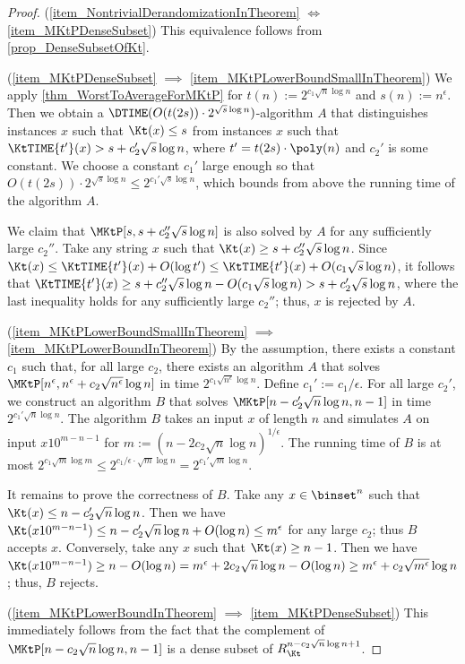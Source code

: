 \documentclass[11pt]{article}
\numberwithin{equation}{section}
\theoremstyle{definition}
\theoremstyle{plain}
\begin{document}
\begin{proof}
  (\cref{item_NontrivialDerandomizationInTheorem} $\Longleftrightarrow$ \cref{item_MKtPDenseSubset})
  This equivalence follows from \cref{prop_DenseSubsetOfKt}.

  (\cref{item_MKtPDenseSubset} $\implies$ \cref{item_MKtPLowerBoundSmallInTheorem})
  We apply \cref{thm_WorstToAverageForMKtP} for $t(n) := 2^{c_1 \sqrt{n} \log n}$ and $s(n) := n^\epsilon$.
  Then we obtain a $\DTIME(O(t(2 s)) \cdot 2^{\sqrt{s} \log n})$-algorithm $A$ that distinguishes
  \Yes instances $x$ such that $\Kt(x) \le s$
  from \No instances $x$ such that $\KtTIME{t'}(x) > s + c_2' \sqrt{s} \log n$, where $t' = t(2s) \cdot \poly(n)$ and $c_2'$ is some constant.
  We choose a constant $c_1'$ large enough so that
  $O(t(2 s)) \cdot 2^{\sqrt{s} \log n} \le 2^{c_1' \sqrt{s} \log n}$, which bounds from above the running time of the algorithm $A$.

  We claim that $\MKtP[s, s + c_2'' \sqrt{s} \log n]$ is also solved by $A$ for any sufficiently large $c_2''$.
  Take any string $x$ such that $\Kt(x) \ge s + c_2'' \sqrt{s} \log n$.
  Since $\Kt(x) \le \KtTIME{t'}(x) + O(\log t') \le \KtTIME{t'}(x) + O(c_1 \sqrt{s} \log n)$,
  it follows that $\KtTIME{t'}(x) \ge s + c_2'' \sqrt{s} \log n - O(c_1 \sqrt{s} \log n) > s + c_2' \sqrt{s} \log n$,
  where the last inequality holds for any sufficiently large $c_2''$; thus, $x$ is rejected by $A$.

  (\cref{item_MKtPLowerBoundSmallInTheorem} $\implies$ \cref{item_MKtPLowerBoundInTheorem})
  By the assumption, there exists a constant $c_1$ such that, for all large $c_2$,
  there exists an algorithm $A$ that solves $\MKtP[n^\epsilon, n^\epsilon +  c_2 \sqrt{n^\epsilon} \log n]$ in time $2^{c_1 \sqrt{n^\epsilon} \log n}$.
  Define $c_1' := c_1 / \epsilon$.
  For all large $c_2'$,
  we construct an algorithm $B$ that solves $\MKtP[n - c_2' \sqrt{n} \log n, n - 1]$ in time $2^{c_1' \sqrt{n} \log n}$.
  The algorithm $B$ takes an input $x$ of length $n$ and simulates $A$ on input $x 1 0^{m - n - 1}$ for $m := (n - 2 c_2 \sqrt{n} \log n)^{1/\epsilon}$.
  The running time of $B$ is at most $2^{c_1 \sqrt{m} \log m} \le 2^{c_1 / \epsilon \cdot \sqrt{m} \log n} = 2^{c_1' \sqrt{m} \log n}$.

  It remains to prove the correctness of $B$.
  Take any $x \in \binset^n$ such that $\Kt(x) \le n - c_2' \sqrt{n} \log n$.
  Then we have
  $\Kt(x10^{m-n-1}) \le n - c_2' \sqrt{n} \log n + O(\log n) \le m^\epsilon$ for any large $c_2$; thus $B$ accepts $x$.
  Conversely, take any $x$ such that $\Kt(x) \ge n - 1$.
  Then we have $\Kt(x10^{m-n-1}) \ge n - O(\log n) = m^{\epsilon} + 2 c_2 \sqrt{n} \log n - O(\log n) \ge m^\epsilon + c_2 \sqrt{m^\epsilon} \log n$;
  thus, $B$ rejects.

  (\cref{item_MKtPLowerBoundInTheorem} $\implies$ \cref{item_MKtPDenseSubset})
  This immediately follows from the fact that
  the complement of $\MKtP[n - c_2 \sqrt{n} \log n, n - 1]$ is a dense subset of $R_\Kt^{n - c_2 \sqrt{n} \log n + 1}$.
\end{proof}
\end{document}
